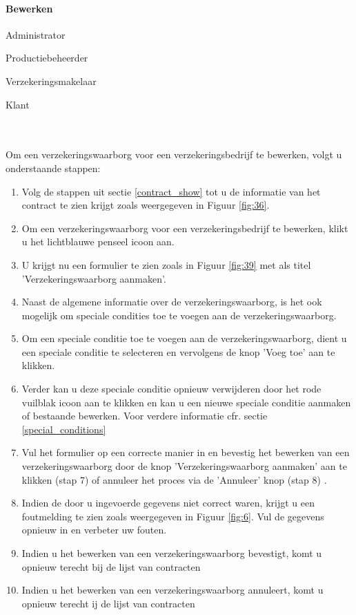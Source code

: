 \documentclass[11pt,openany]{article}
\newcommand{\cmark}{\ding{51}}%
\newcommand{\xmark}{\ding{55}}%
\newcommand{\done}{\rlap{$\square$}{\raisebox{2pt}{\large\hspace{1pt}\cmark}}%
	\hspace{-2.5pt}}
\newcommand{\wontfix}{\rlap{$\square$}{\large\hspace{1pt}\xmark}}
\begin{document}
\paragraph{Bewerken}
\begin{todolist}
	\item[\done] Administrator
	\item[\done] Productiebeheerder
	\item[\done] Verzekeringsmakelaar
	\item[\wontfix] Klant 
\end{todolist}
\\
\\
Om een verzekeringswaarborg voor een verzekeringsbedrijf te bewerken, volgt u onderstaande stappen:
\begin{enumerate}
	\item  Volg de stappen uit sectie \ref{contract_show} tot u de informatie van het contract te zien krijgt zoals weergegeven in Figuur \ref{fig:36}.
	\item Om een verzekeringswaarborg voor een verzekeringsbedrijf  te bewerken, klikt u het lichtblauwe penseel icoon aan.
	\item U krijgt nu een formulier te zien zoals in Figuur \ref{fig:39} met als titel 'Verzekeringswaarborg aanmaken'.
	\item Naast de algemene informatie over de verzekeringswaarborg, is het ook mogelijk om speciale condities toe te voegen aan de verzekeringswaarborg.
	\item Om een speciale conditie toe te voegen aan de verzekeringswaarborg, dient u een speciale conditie te selecteren en vervolgens de knop 'Voeg toe' aan te klikken.
	\item Verder kan u deze speciale conditie opnieuw verwijderen door het rode vuilblak icoon aan te klikken en kan u een nieuwe speciale conditie aanmaken of bestaande bewerken. Voor verdere informatie cfr. sectie \ref{special_conditions}
	\item Vul het formulier op een correcte manier in en bevestig het bewerken van een verzekeringswaarborg door de knop 'Verzekeringswaarborg aanmaken' aan te klikken (stap 7) of annuleer het proces via de 'Annuleer' knop (stap 8) .
	\item Indien de door u ingevoerde gegevens niet correct waren, krijgt u een foutmelding te zien zoals weergegeven in Figuur \ref{fig:6}. Vul de gegevens opnieuw in en verbeter uw fouten.
	\item Indien u het bewerken van een verzekeringswaarborg bevestigt, komt u opnieuw terecht bij de lijst van contracten
	\item Indien u het bewerken van een verzekeringswaarborg annuleert, komt u opnieuw terecht ij de lijst van contracten
\end{enumerate}
\end{document}
